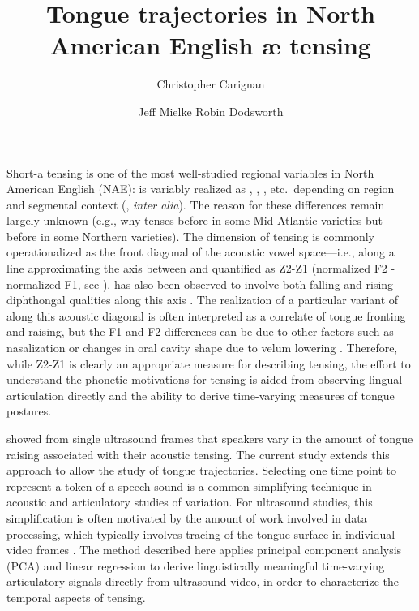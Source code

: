\documentclass[output=paper]{LSP/langsci}
\author{Christopher Carignan\affiliation{North Carolina State University} \and Jeff Mielke\affiliation{North Carolina State University} \lastand Robin Dodsworth\affiliation{North Carolina State University}}
\title{Tongue trajectories in {N}orth {A}merican {E}nglish {æ} tensing}
\begin{document}
 



Short-a tensing is one of the most well-studied regional variables in North American English (NAE): \ips{\ae} is variably realized as \ip{\ae}, , , etc.~depending on region and segmental context 
(\citealp{ash_distribution_2002,becker_short-system_2009,boberg_regional_2008,boberg_short-cincinnati:_2000,labov_atlas_2006-1,plichta_interdisciplinary_2005}, \textit{inter alia}). The reason for these differences remain largely unknown (e.g., why \ips{\ae} tenses before  in some Mid-Atlantic varieties but before  in some Northern varieties). The dimension of \ips{\ae} tensing is commonly operationalized as the front diagonal of the acoustic vowel space---i.e., along a line approximating the axis between  and  quantified as Z2-Z1 (normalized F2 - normalized F1, see \citealp{labov_one_2013}). \ips{\ae} has also been observed to involve both falling and rising diphthongal qualities along this axis \citep{assmann_time-varying_2000,fox_cross-dialectal_2009,labov_atlas_2006-1}.  The realization of a particular variant of \ips{\ae} along this acoustic diagonal is often interpreted as a correlate of tongue fronting and raising, but the F1 and F2 differences can be due to other factors such as nasalization \citep{decker_are_2012} or changes in oral cavity shape due to velum lowering \citep{baker_more_2008}.  Therefore, while Z2-Z1 is clearly an appropriate measure for describing \ips{\ae} tensing, the effort to understand the phonetic motivations for \ips{\ae} tensing is aided from observing lingual articulation directly and the ability to derive time-varying measures of tongue postures. 

\citet{decker_are_2012} showed from single ultrasound frames that speakers vary in the amount of tongue raising associated with their acoustic tensing.  The current study extends this approach to allow the study of tongue trajectories. Selecting one time point to represent a token of a speech sound is a common simplifying technique in acoustic and articulatory studies of variation.  For ultrasound studies, this simplification is often motivated by the amount of work involved in data processing, which typically involves tracing of the tongue surface in individual video frames \citep{li_automatic_2005}.
The method described here applies principal component analysis (PCA) and linear regression to derive linguistically meaningful time-varying articulatory signals directly from ultrasound video, in order to characterize the temporal aspects of \ips{\ae} tensing.
\end{document}
